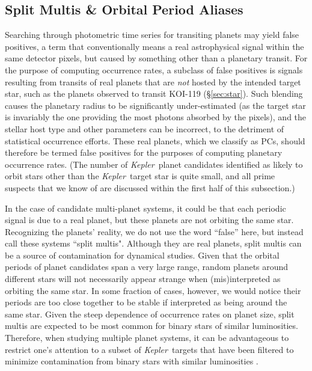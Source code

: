 \documentclass{aastex62}
\newcommand{\ik}{{\it Kepler~}}
\begin{document}

\smallskip
\subsection{Split Multis \& Orbital Period Aliases}\label{sec:falsemultis}

Searching through photometric time series for transiting planets may yield false positives, a term that conventionally means a real astrophysical signal within the same detector pixels, but caused by something other than a planetary transit.   For the purpose of computing occurrence rates, a subclass of false positives is signals resulting from transits of real planets  that are \emph{not} hosted by the intended target star, such as the planets observed to transit KOI-119 (\S\ref{sec:star}). Such blending causes the planetary radius to be significantly under-estimated (as the target star is invariably the one providing the most photons absorbed by the pixels), and the stellar host type and other parameters can be incorrect, to the detriment of statistical occurrence efforts. These real planets, which we classify as PCs, should therefore be termed false positives for the purposes of computing planetary occurrence rates. {(The number of \ik planet candidates identified as likely to orbit stars other than the \ik target star is quite small, and all prime suspects that we know of are discussed within the first half of this subsection.)}

In the case of candidate multi-planet systems, it could be that each periodic signal is due to a real planet, but these planets are not orbiting the same star. Recognizing the planets' reality, we do not use the word ``false'' here, but instead call these systems ``split multis". Although they are real planets, split multis can be a source of contamination for dynamical studies. Given that the orbital periods of planet candidates span a very large range, random planets around different stars will not necessarily appear strange when (mis)interpreted as orbiting the same star. 
In some fraction of cases, however, we would notice their periods are too close together to be stable if interpreted as being around the same star. 
Given the steep dependence of occurrence rates on planet size, split multis are expected to be most common for binary stars of similar luminosities.  
Therefore, when studying multiple planet systems, it can be advantageous to restrict one's attention to a subset of \ik targets that have been filtered to minimize contamination from binary stars with similar luminosities \citep[e.g.,][]{Hsu:2019,He:2020}.
\end{document}
